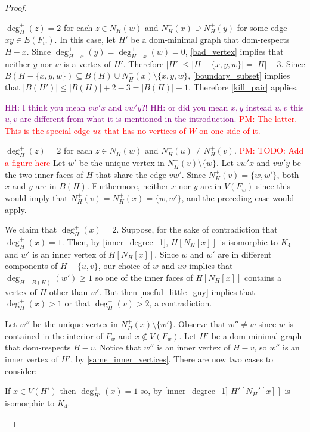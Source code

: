 \documentclass{article}
\newcommand{\pat}[1]{\textcolor{red}{PM: #1}}
\newcommand{\hussein}[1]{\textcolor{purple}{HH: #1}}
\theoremstyle{definition}
\begin{document}
\begin{proof}
\begin{compactenum}[(i)]
    \item $\deg^+_H(z)=2$ for each $z\in N_H(w)$ and $N^+_H(x)\supseteq N^+_H(y)$ for some edge $xy\in E(F_w)$.  In this case, let $H'$ be a dom-minimal graph that dom-respects $H-x$. Since $\deg^+_{H-x}(y)=\deg^+_{H-x}(w)=0$, \cref{bad_vertex} implies that neither $y$ nor $w$ is a vertex of $H'$.  Therefore $|H'|\le |H-\{x,y,w\}|=|H|-3$.  Since $B(H-\{x,y,w\})\subseteq B(H)\cup N^+_{H}(x)\setminus \{x,y,w\}$, \cref{boundary_subset} implies that $|B(H')|\le |B(H)|+2-3=|B(H)|-1$. Therefore \cref{kill_pair} applies.

\hussein{I think you mean $vw'x$ and $vw'y$?!} \hussein{or did you mean $x, y$ instead $u, v$ this $u,v$ are different from what it is mentioned in the introduction.} \pat{The latter. This is the special edge $uv$ that has no vertices of $W$ on one side of it.}
    \item $\deg^+_H(z)=2$ for each $z\in N_H(w)$ and $N^+_H(u)\neq N^+_H(v)$. \pat{TODO: Add a figure here} Let $w'$ be the unique vertex in $N^+_H(v)\setminus\{w\}$.  Let $vw'x$ and $vw'y$ be the two inner faces of $H$ that share the edge $vw'$.  Since $N^+_H(v)=\{w,w'\}$, both $x$ and $y$ are in $B(H)$.  Furthermore, neither $x$ nor $y$ are in $V(F_w)$ since this would imply that $N^+_H(v)= N^+_H(x)=\{w,w'\}$, and the preceding case would apply.

    We claim that $\deg^+_H(x)=2$.  Suppose, for the sake of contradiction that $\deg^+_H(x)=1$.  Then, by \cref{inner_degree_1}, $H[N_H[x]]$ is isomorphic to $K_4$ and $w'$ is an inner vertex of $H[N_H[x]]$.  Since $w$ and $w'$ are in different components of $H-\{u,v\}$, our choice of $w$ and $uv$ implies that $\deg_{H-B(H)}(w')\ge 1$ so one of the inner faces of $H[N_H[x]]$ contains a vertex of $H$ other than $w'$.  But then \cref{useful_little_guy} implies that $\deg^+_H(x)>1$ or that $\deg^+_H(v)>2$, a contradiction.


    Let $w''$ be the unique vertex in $N^+_H(x)\setminus\{w'\}$.  Observe that $w''\neq w$ since $w$ is contained in the interior of $F_w$ and $x\not\in V(F_w)$.  Let $H'$ be a dom-minimal graph that dom-respects $H-v$.  Notice that $w''$ is an inner vertex of $H-v$, so $w''$ is an inner vertex of $H'$, by \cref{same_inner_vertices}.  There are now two cases to consider:
    \begin{compactenum}
      \item If $x\in V(H')$ then $\deg^+_{H'}(x)=1$ so, by \cref{inner_degree_1} $H'[N_H'[x]]$ is isomorphic to $K_4$.


\end{compactenum}
\end{compactenum}
\end{proof}
\end{document}
